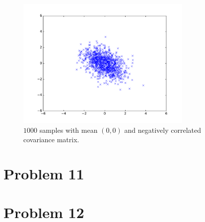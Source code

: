 \documentclass[12pt]{article}
\begin{document}
\begin{figure}[H]
        \begin{center}
                \includegraphics[height=2.5in]{Problem10-e}
                \caption{\(1000\) samples with mean \((0,0)\) and negatively correlated covariance matrix.}
        \end{center}
\end{figure}

\section*{Problem 11}
\section*{Problem 12}
\end{document}
